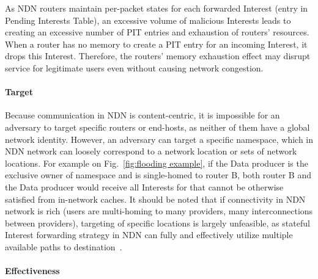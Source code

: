 As NDN routers maintain per-packet states for each forwarded Interest (entry in Pending Interests Table), an excessive volume of malicious Interests leads to creating an excessive number of PIT entries and exhaustion of routers' resources.
When a router has no memory to create a PIT entry for an incoming Interest, it drops this Interest.
Therefore, the routers' memory exhaustion effect may disrupt service for legitimate users even without causing network congestion.

\paragraph{Target}

Because communication in NDN is content-centric, it is impossible for an adversary to target specific routers or end-hosts, as neither of them have a global network identity.
However, an adversary can target a specific namespace, which in NDN network can loosely correspond to a network location or sets of network locations.
For example on Fig.~\ref{fig:flooding example}, if the Data producer is the exclusive owner of  namespace and is single-homed to router B, both router B and the Data producer would receive all Interests for  that cannot be otherwise satisfied from in-network caches.
It should be noted that if connectivity in NDN network is rich (users are multi-homing to many providers, many interconnections between providers), targeting of specific locations is largely unfeasible, as stateful Interest forwarding strategy in NDN can fully and effectively utilize multiple available paths to destination~\cite{adaptive-forwarding}.


\paragraph{Effectiveness}


